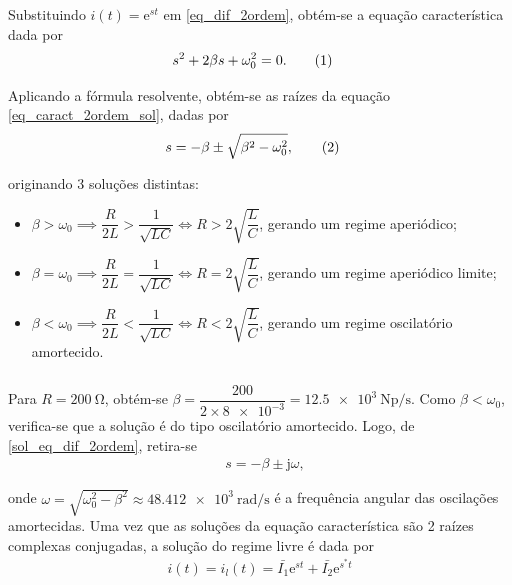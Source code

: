 \documentclass[a4paper, titlepage, portuguese]{article}
\newcommand{\eq}{\Leftrightarrow} %
\newcommand\numberthis{\addtocounter{equation}{1}\tag{\theequation}}
\newcommand\e{\mathrm{e} }
\newcommand\jj{\mathrm{j} }
\begin{document}
	\subsubsection{}

		\par
		Substituindo $i(t) = \e^{st}$ em \eqref{eq_dif_2ordem}, obtém-se a equação característica dada por
		\begin{align*}
			&s^{2} + 2\beta s + \omega_{0}^{2} = 0 .\numberthis \label{eq_caract_2ordem_sol}
		\end{align*}

		Aplicando a fórmula resolvente, obtém-se as raízes da equação \eqref{eq_caract_2ordem_sol}, dadas por
		\begin{align*}
			&s =   -\beta \pm \sqrt{ \beta^{2} - \omega_{0}^{2}}, \numberthis \label{sol_eq_caract_2ordem}
		\end{align*}

		originando 3 soluções distintas:

		\begin{itemize}
			\item $\beta > \omega_{0} \implies \dfrac{R}{2L} > \dfrac{1}{\sqrt{LC}} \eq R > 2
			\sqrt{\dfrac{L}{C}}$, gerando um regime aperiódico;

			\item $\beta = \omega_{0} \implies \dfrac{R}{2L} = \dfrac{1}{\sqrt{LC}} \eq R = 2
			\sqrt{\dfrac{L}{C}}$, gerando um regime aperiódico limite;

			\item $\beta < \omega_{0} \implies \dfrac{R}{2L} < \dfrac{1}{\sqrt{LC}} \eq R < 2
			\sqrt{\dfrac{L}{C}}$, gerando um regime oscilatório amortecido.
		\end{itemize}

	\subsubsection{}

		\par
		Para $R = \SI{200}{\ohm} $, obtém-se $\beta = \dfrac{200}{2 \times \num{8e-3}} = \SI{12.5e3}{\neper\per\second}$. Como $\beta < \omega_{0}$, verifica-se que a solução é do tipo oscilatório amortecido. Logo, de \eqref{sol_eq_dif_2ordem}, retira-se
		\begin{align*}
			&s =   -\beta \pm \jj \omega,
		\end{align*}

		onde $\omega = \sqrt{\omega_{0}^{2} - \beta^{2}} \approx \SI{48.412e3}{\radian\per\second}$ é a frequência angular das oscilações amortecidas. Uma vez que as soluções da equação característica são 2 raízes complexas conjugadas, a solução do regime livre é dada por
		\begin{align*}
			i(t) = i_l (t) =  \bar{I_1}\e^{st} + \bar{I_2}\e^{s^{*}t}
		\end{align*}
\end{document}
